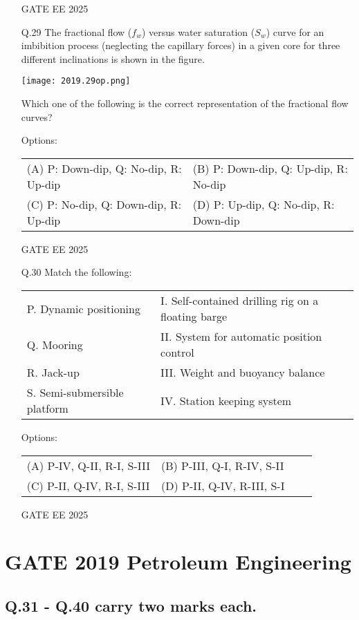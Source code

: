 \documentclass[journal]{IEEEtran}
\begin{document}
\begin{enumerate}[resume*=q]
GATE EE 2025
 \vspace{0.5cm} 
\item[Q.29] The fractional flow ($f_w$) versus water saturation ($S_w$) curve for an imbibition process (neglecting the capillary forces) in a given core for three different inclinations is shown in the figure.

\begin{center}
\texttt{[image: 2019.29op.png]}
\end{center}

Which one of the following is the correct representation of the fractional flow curves?

Options:
\begin{tabular}{ll}
(A) P: Down-dip, Q: No-dip, R: Up-dip & (B) P: Down-dip, Q: Up-dip, R: No-dip \\
(C) P: No-dip, Q: Down-dip, R: Up-dip & (D) P: Up-dip, Q: No-dip, R: Down-dip
\end{tabular}

GATE EE 2025
 \vspace{0.5cm} 
\item[Q.30] Match the following:

\begin{tabular}{ll}
P. Dynamic positioning & I. Self-contained drilling rig on a floating barge \\
Q. Mooring & II. System for automatic position control \\
R. Jack-up & III. Weight and buoyancy balance \\
S. Semi-submersible platform & IV. Station keeping system \\
\end{tabular}

Options:
\begin{tabular}{llll}
(A) P-IV, Q-II, R-I, S-III & (B) P-III, Q-I, R-IV, S-II \\
(C) P-II, Q-IV, R-I, S-III & (D) P-II, Q-IV, R-III, S-I
\end{tabular}

GATE EE 2025
 \vspace{0.5cm} 
\end{enumerate}


\section*{GATE 2019 Petroleum Engineering}

\subsection*{Q.31 - Q.40 carry two marks each.}
\end{document}
